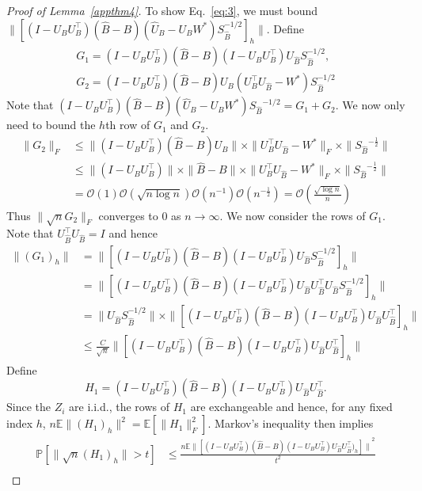 \begin{proof}[Proof of Lemma~\ref{appthm4}]
To show Eq.~\eqref{eq:3}, we must bound $\|[ (I -U_B U_B^{\top}) (\hat{B} - B) (\hat{U}_B - U_B W^{*}) S_{\hat{B}}^{-1/2}]_{h}\|$.
Define 
\begin{gather*} G_1 =  (I -U_B U_B^{\top}) (\hat{B} - B) (I -U_B U_B^{\top}) U_{\hat{B}} S_{\hat{B}}^{-1/2}, \\
 G_2 =  (I -U_B U_B^{\top}) (\hat{B} - B) U_B ( U_B^{\top} U_{\hat{B}} - W^{*})S_{\hat{B}}^{-1/2} 
\end{gather*}
Note that $(I -U_B U_B^{\top}) (\hat{B} - B) (\hat{U}_B - U_B W^{*}) {S_{\hat{B}}}^{-1/2} = G_1 + G_2.$ 
We now only need to bound the $h$th row of $G_1$ and $G_2$.
\begin{align*}
    \| G_2 \|_F & \leq \|(I -U_B U_B^{\top}) (\hat{B} - B) U_B \| \times \| U_B^{\top} U_{\hat{B}} - W^{*} \|_F \times \| {S_{\hat{B}}}^{-\frac{1}{2}} \| \\
    & \leq \|(I -U_B U_B^{\top}) \| \times \|\hat{B} - B\| \times \| U_B^{\top} U_{\hat{B}} - W^{*} \|_F \times \| {S_{\hat{B}}}^{-\frac{1}{2}} \| \\
    & = \mathcal{O}(1) \mathcal{O}(\sqrt{n \log n} )  \mathcal{O}(n^{-1} ) \mathcal{O}(n^{-\frac{1}{2}} )  = \mathcal{O}(\frac{\sqrt{\log n}}{n}) 
\end{align*}
Thus $\|\sqrt{n} G_2 \|_F$ converges to $0$ as $n \rightarrow \infty.$
We now consider the rows of $G_1$. Note that $U_{\hat{B}}^{\top} U_{\hat{B}} = I $ and hence
\begin{align*}
    \|(G_1)_h\| & = \| [ (I -U_B U_B^{\top}) (\hat{B} - B) (I -U_B U_B^{\top}) U_{\hat{B}} S_{\hat{B}}^{-1/2} ]_h \| \\
    & = \| [ (I -U_B U_B^{\top}) (\hat{B} - B) (I -U_B U_B^{\top}) U_{\hat{B}} U_{\hat{B}}^{\top} U_{\hat{B}} S_{\hat{B}}^{-1/2} ]_h \| \\
    & = \| U_{\hat{B}} S_{\hat{B}}^{-1/2} \| \times \| [ (I -U_B U_B^{\top}) (\hat{B} - B) (I -U_B U_B^{\top}) U_{\hat{B}} U_{\hat{B}}^{\top} ]_h\| \\
    & \leq \frac{C}{\sqrt{n}} \| [ (I -U_B U_B^{\top}) (\hat{B} - B) (I -U_B U_B^{\top}) U_{\hat{B}} U_{\hat{B}}^{\top} ]_h\|
\end{align*}
Define $$ H_1 = (I -U_B U_B^{\top}) (\hat{B} - B) (I -U_B U_B^{\top}) U_{\hat{B}} U_{\hat{B}}^{\top}.$$ Since the $Z_i$ are i.i.d., the rows of $H_1$ are exchangeable and hence, for any fixed index $h$, $n \mathbb{E} \|(H_1)_h \|^2 = \mathbb{E}[\|H_1\|_F^2]$. Markov's inequality then implies
  \begin{align*}
    \mathbb{P} [ \|\sqrt{n} (H_1)_h \| > t] & \leq \frac{n \mathbb{E} {\| [(I -U_B U_B^{\top}) (\hat{B} - B) (I -U_B U_B^{\top}) U_{\hat{B}} U_{\hat{B}}^\top)_h]\|}^2 }{t^2} \\

\end{align*}
\end{proof}
